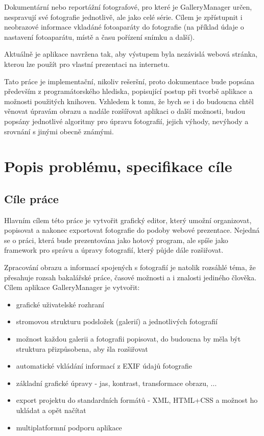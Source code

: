 \documentclass[11pt,twoside,a4paper]{book}
\begin{document}
\indent
Dokumentární nebo reportážní fotografové, pro které je GalleryManager určen, nespravují své fotografie jednotlivě, ale jako celé série. Cílem je zpřístupnit i neobrazové informace vkladáné fotoaparáty do fotografie (na příklad údaje o nastavení fotoaparátu, místě a času pořízení snímku a další).

\indent
Aktuálně je aplikace navržena tak, aby výstupem byla nezávislá webová stránka, kterou lze použít pro vlastní prezentaci na internetu.

\indent
Tato práce je implementační, nikoliv rešeršní, proto dokumentace bude popsána především z programátorského hlediska, popisující postup při tvorbě aplikace a možnosti použitých knihoven. Vzhledem k tomu, že bych se i do budoucna chtěl věnovat úpravám obrazu a nadále rozšířovat aplikaci o další možnosti, budou popsány jednotlivé algoritmy pro úpravu fotografií, jejich výhody, nevýhody a srovnání s jinými obecně známými.


\chapter{Popis problému, specifikace cíle}
\section{Cíle práce}

\noindent
Hlavním cílem této práce je vytvořit grafický editor, který umožní organizovat, popisovat a nakonec exportovat fotografie do podoby webové prezentace. Nejedná se o práci, která bude prezentována jako hotový program, ale spíše jako framework pro správu a úpravy fotografií, který půjde dále rozšiřovat.

\indent
Zpracování obrazu a informací spojených s fotografií je natolik rozsáhlé téma, že přesahuje rozsah bakalářské práce, časové možnosti a i znalosti jediného člověka. Cílem aplikace GalleryManager je vytvořit:

\begin{itemize}
\item grafické uživatelské rozhraní
\item stromovou strukturu podsložek (galerií) a jednotlivých fotografií
\item možnost každou galerii a fotografii popisovat, do budoucna by měla být struktura přizpůsobena, aby šla rozšiřovat
\item automatické vkládání informací z EXIF údajů fotografie
\item základní grafické úpravy - jas, kontrast, transformace obrazu, ...
\item export projektu do standardních formátů - XML, HTML+CSS a možnost ho ukládat a opět načítat
\item multiplatformní podporu aplikace
\end{itemize}
\end{document}
